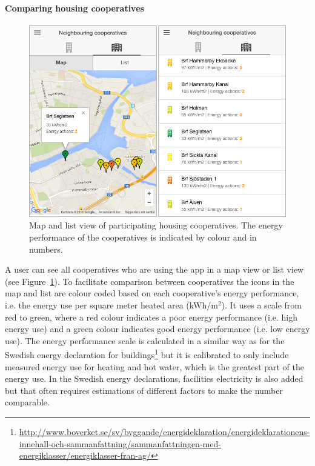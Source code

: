 \paragraph{Comparing housing cooperatives}

\begin{figure}
	\centering
	\includegraphics[width=0.9\linewidth]{img/Figure202_Housing_cooperatives_comparison.png}
	\caption{Map and list view of participating housing cooperatives. The energy performance of the cooperatives is indicated by colour and in numbers.}
	\label{fig:Figure202_Housing_cooperatives_comparison}
\end{figure}

A user can see all cooperatives who are using the app in a map view or list view (see Figure~\ref{fig:Figure202_Housing_cooperatives_comparison}). To facilitate comparison between cooperatives the icons in the map and list are colour coded based on each cooperative's energy performance, i.e. the energy use per square meter heated area (kWh/m$^2$). It uses a scale from red to green, where a red colour indicates a poor energy performance (i.e. high energy use) and a green colour indicates good energy performance (i.e. low energy use). The energy performance scale is calculated in a similar way as for the Swedish energy declaration for buildings\footnote{\url{http://www.boverket.se/sv/byggande/energideklaration/energideklarationens-innehall-och-sammanfattning/sammanfattningen-med-energiklasser/energiklasser-fran-ag/}}  but it is calibrated to only include measured energy use for heating and hot water, which is the greatest part of the energy use. In the Swedish energy declarations, facilities electricity is also added but that often requires estimations of different factors to make the number comparable.




